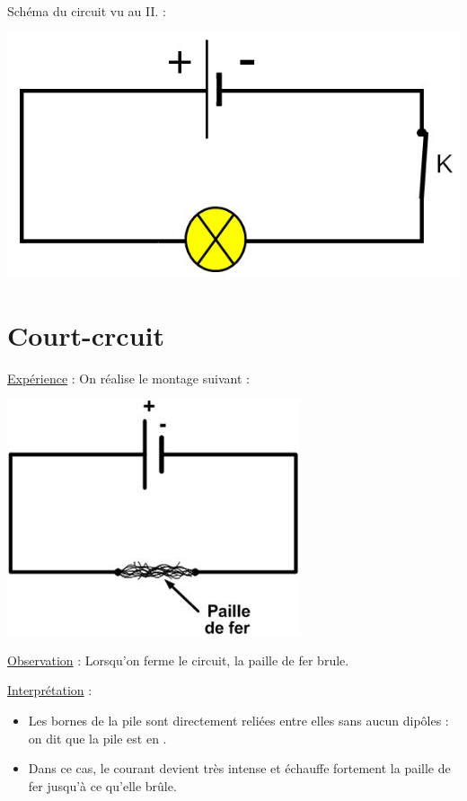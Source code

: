 \documentclass[12pt,a4paper]{article}
\begin{document}
\begin{myex}
	Schéma du circuit vu au II. :
	\begin{center}
		\includegraphics[scale=0.6]{img/schema}
	\end{center}
\end{myex}

\section{Court-crcuit}

\underline{Expérience} : On réalise le montage suivant :

\begin{center}
	\includegraphics[scale=0.5]{img/courtcircuit}
\end{center}

\underline{Observation} : Lorsqu'on ferme le circuit, la paille de fer brule.

\underline{Interprétation} :

\begin{itemize}
	\item Les bornes de la pile sont directement reliées entre elles sans aucun dipôles : on dit que la pile est en .
	\item Dans ce cas, le courant devient très intense et échauffe fortement la paille de fer jusqu'à ce qu'elle brûle.
\end{itemize}
\end{document}

